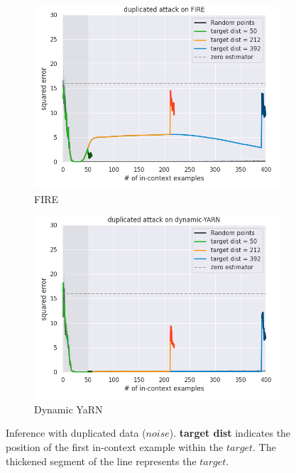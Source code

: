 \documentclass[letterpaper]{article} %
\begin{document}
\begin{figure}[htbp]
\begin{subfigure}[b]{0.23\textwidth}
        \includegraphics[width=\textwidth]{AnonymousSubmission/LaTeX/imgs/appendix/fire_noise.png}
        \caption{FIRE}
    \end{subfigure}
    \begin{subfigure}[b]{0.23\textwidth}
        \includegraphics[width=\textwidth]{AnonymousSubmission/LaTeX/imgs/appendix/dyarn_noise.png}
        \caption{Dynamic YaRN}
    \end{subfigure}
    \caption{
       Inference with duplicated data ($noise$). \textbf{target dist} indicates the position of the first in-context example within the $target$. The thickened segment of the line represents the $target$.
    }
    \label{fig:noise_appendix}
\end{figure}
\end{document}
